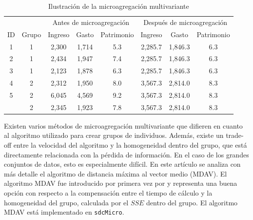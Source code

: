\documentclass[]{book}
\theoremstyle{definition}
\theoremstyle{definition}
\theoremstyle{definition}
\theoremstyle{definition}
\theoremstyle{remark}
\begin{document}
\begin{table}

\caption{\label{tab:Tabla17}\label{tab:Tabla17}Ilustración de la microagregación multivariante}
\centering
\begin{tabular}[t]{cccccccc}
\toprule
\multicolumn{2}{c}{ } & \multicolumn{3}{c}{Antes de microagregación} & \multicolumn{3}{c}{Después de microagregación} \\
\cmidrule(l{3pt}r{3pt}){3-5} \cmidrule(l{3pt}r{3pt}){6-8}
ID & Grupo & Ingreso & Gasto & Patrimonio & Ingreso & Gasto & Patrimonio\\
\midrule
1 & 1 & 2,300 & 1,714 & 5.3 & 2,285.7 & 1,846.3 & 6.3\\
2 & 1 & 2,434 & 1,947 & 7.4 & 2,285.7 & 1,846.3 & 6.3\\
3 & 1 & 2,123 & 1,878 & 6.3 & 2,285.7 & 1,846.3 & 6.3\\
4 & 2 & 2,312 & 1,950 & 8.0 & 3,567.3 & 2,814.0 & 8.3\\
5 & 2 & 6,045 & 4,569 & 9.2 & 3,567.3 & 2,814.0 & 8.3\\
\addlinespace
6 & 2 & 2,345 & 1,923 & 7.8 & 3,567.3 & 2,814.0 & 8.3\\
\bottomrule
\end{tabular}
\end{table}

Existen varios métodos de microagregación multivariante que difieren en cuanto al algoritmo utilizado para crear grupos de individuos. Además, existe un trade-off entre la velocidad del algoritmo y la homogeneidad dentro del grupo, que está directamente relacionada con la pérdida de información. En el caso de los grandes conjuntos de datos, esto es especialmente difícil. En este artículo se analiza con más detalle el algoritmo de distancia máxima al vector medio (MDAV). El algoritmo MDAV fue introducido por primera vez por \citep{DoTo05} y representa una buena opción con respecto a la compensación entre el tiempo de cálculo y la homogeneidad del grupo, calculada por el \(SSE\) dentro del grupo. El algoritmo MDAV está implementado en \texttt{sdcMicro}.
\end{document}

